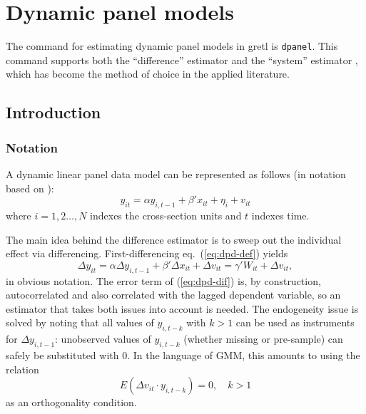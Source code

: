\chapter{Dynamic panel models}
\label{chap:dpanel}

\newcommand{\by}{\mathbf{y}}
\newcommand{\bx}{\mathbf{x}}
\newcommand{\bv}{\mathbf{v}}
\newcommand{\bX}{\mathbf{X}}
\newcommand{\bW}{\mathbf{W}}
\newcommand{\bZ}{\mathbf{Z}}
\newcommand{\bA}{\mathbf{A}}
\newcommand{\bM}{\mathbf{M}}
\newcommand{\biota}{\bm{\iota}}

\newenvironment%
{altcode}%
{\vspace{1ex}\small\leftmargin 1em}{\vspace{1ex}}

The command for estimating dynamic panel models in gretl is
\texttt{dpanel}. This command supports both the ``difference''
estimator \citep{arellano-bond91} and the ``system'' estimator
\citep{blundell-bond98}, which has become the method of choice in the
applied literature.

\section{Introduction}
\label{sec:dpanel-intro}

\subsection{Notation}
\label{sec:dpanel-notation}

A dynamic linear panel data model can be represented as follows
(in notation based on \cite{arellano03}):
\begin{equation}
  \label{eq:dpd-def}
  y_{it} = \alpha y_{i,t-1} + \beta'x_{it} + \eta_{i} + v_{it}
\end{equation}
where $i=1,2\ldots,N$ indexes the cross-section units and $t$ indexes
time.

The main idea behind the difference estimator is to sweep out the
individual effect via differencing.  First-differencing eq.\
(\ref{eq:dpd-def}) yields
\begin{equation}
  \label{eq:dpd-dif}
  \Delta y_{it} = \alpha \Delta y_{i,t-1} + \beta'\Delta x_{it} +
  \Delta v_{it} = \gamma' W_{it} + \Delta v_{it} ,
\end{equation}
in obvious notation. The error term of (\ref{eq:dpd-dif}) is, by
construction, autocorrelated and also correlated with the lagged
dependent variable, so an estimator that takes both issues into
account is needed. The endogeneity issue is solved by noting that all
values of $y_{i,t-k}$ with $k>1$ can be used as instruments for
$\Delta y_{i,t-1}$: unobserved values of $y_{i,t-k}$ (whether missing
or pre-sample) can safely be substituted with 0. In the language of
GMM, this amounts to using the relation
\begin{equation}
  \label{eq:OC-dif}
  E(\Delta v_{it} \cdot y_{i,t-k}) = 0, \quad k>1
\end{equation}
as an orthogonality condition.

